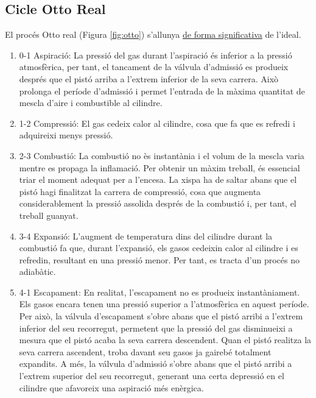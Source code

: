     \subsection{Cicle Otto Real}

    El procés Otto real (Figura \ref{fig:otto}) s'allunya \href{http://tesla.us.es/wiki/index.php/Ciclo_Otto}{de forma significativa} de l'ideal. 



    \begin{enumerate}
        \item 0-1 Aspiraci\'o: 
        La pressi\'o del gas durant l'aspiraci\'o \'es inferior a la pressi\'o atmosf\`erica, per tant, el tancament de la v\'alvula d'admissi\'o es produeix despr\'es que el pist\'o arriba a l'extrem inferior de la seva carrera. Aix\`o prolonga el per\'iode d'admissi\'o i permet l'entrada de la m\`axima quantitat de mescla d'aire i combustible al cilindre.
        
        \item 1-2 Compressi\'o:
        El gas cedeix calor al cilindre, cosa que fa que es refredi i adquireixi menys pressi\'o.
        
        \item 2-3 Combusti\'o:
        La combusti\'o no \`es instant\`ania i el volum de la mescla varia mentre es propaga la inflamaci\'o. Per obtenir un m\`axim treball, \'es essencial triar el moment adequat per a l'encesa. La xispa ha de saltar abans que el pist\'o hagi finalitzat la carrera de compressi\'o, cosa que augmenta considerablement la pressi\'o assolida despr\'es de la combusti\'o i, per tant, el treball guanyat.
        
        \item 3-4 Expansi\'o: 
        L'augment de temperatura dins del cilindre durant la combusti\'o fa que, durant l'expansi\'o, els gasos cedeixin calor al cilindre i es refredin, resultant en una pressi\'o menor. Per tant, es tracta d'un procés no adiabàtic.
        
        \item 4-1 Escapament:
        En realitat, l'escapament no es produeix instant\`aniament. Els gasos encara tenen una pressi\'o superior a l'atmosf\`erica en aquest per\'iode. Per aix\`o, la v\'alvula d'escapament s'obre abans que el pist\'o arribi a l'extrem inferior del seu recorregut, permetent que la pressi\'o del gas disminueixi a mesura que el pist\'o acaba la seva carrera descendent. Quan el pist\'o realitza la seva carrera ascendent, troba davant seu gasos ja gaireb\'e totalment expandits. A m\'es, la v\'alvula d'admissi\'o s'obre abans que el pist\'o arribi a l'extrem superior del seu recorregut, generant una certa depressi\'o en el cilindre que afavoreix una aspiraci\'o m\'es en\`ergica.
    \end{enumerate}



